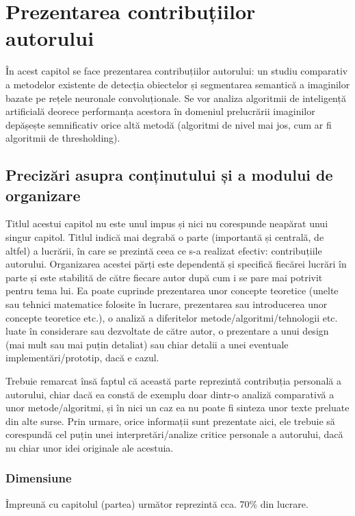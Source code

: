 \chapter{Prezentarea contribuțiilor autorului}
\label{cap:contributii}
În acest capitol se face prezentarea contribuțiilor autorului: un studiu comparativ a metodelor existente de detecția obiectelor și segmentarea semantică a imaginilor bazate pe rețele neuronale convoluționale. Se vor analiza algoritmii de inteligență artificială deorece performanța acestora în domeniul prelucrării imaginilor depășește semnificativ orice altă metodă (algoritmi de nivel mai jos, cum ar fi algoritmii de thresholding).

\section{Precizări asupra conținutului și a modului de organizare}

Titlul acestui capitol nu este unul impus și nici nu corespunde neapărat unui singur capitol. Titlul indică mai degrabă o parte (importantă și centrală, de altfel) a lucrării, în care se prezintă ceea ce s-a realizat efectiv: contribuțiile autorului. Organizarea acestei părți este dependentă și specifică fiecărei lucrări în parte și este stabilită de către fiecare autor după cum i se pare mai potrivit pentru tema lui. Ea poate cuprinde prezentarea unor concepte teoretice (unelte sau tehnici matematice folosite în lucrare, prezentarea sau introducerea unor concepte teoretice etc.), o analiză a diferitelor metode/algoritmi/tehnologii etc. luate în considerare sau dezvoltate de către autor, o prezentare a unui design (mai mult sau mai puțin detaliat) sau chiar detalii a unei eventuale implementări/prototip, dacă e cazul.

Trebuie remarcat însă faptul că această parte reprezintă contribuția personală a autorului, chiar dacă ea constă de exemplu doar dintr-o analiză comparativă a unor metode/algoritmi, și în nici un caz ea nu poate fi sinteza unor texte preluate din alte surse. Prin urmare, orice informații sunt prezentate aici, ele trebuie să corespundă cel puțin unei interpretări/analize critice personale a autorului, dacă nu chiar unor idei originale ale acestuia. 

\subsection{Dimensiune}

Împreună cu capitolul (partea) următor reprezintă cca. 70\% din lucrare. 


